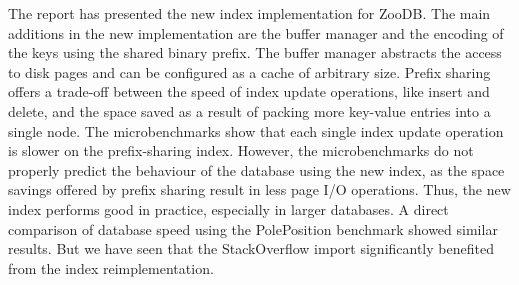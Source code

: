 \documentclass[11pt,a4paper,oneside]{article}
\begin{document}
The report has presented the new index implementation for ZooDB. The main additions in the new implementation are the buffer manager and the encoding of the keys using the shared binary prefix. The buffer manager abstracts the access to disk pages and can be configured as a cache of arbitrary size. Prefix sharing offers a trade-off between the speed of index update operations, like insert and delete, and the space saved as a result of packing more key-value entries into a single node. The microbenchmarks show that each single index update operation is slower on the prefix-sharing index. However, the microbenchmarks do not properly predict the behaviour of the database using the new index, as the space savings offered by prefix sharing result in less page I/O operations. Thus, the new index performs good in practice, especially in larger databases. 
A direct comparison of database speed using the PolePosition benchmark showed similar results. 
But we have seen that the StackOverflow import significantly benefited from the index reimplementation.
\end{document}
